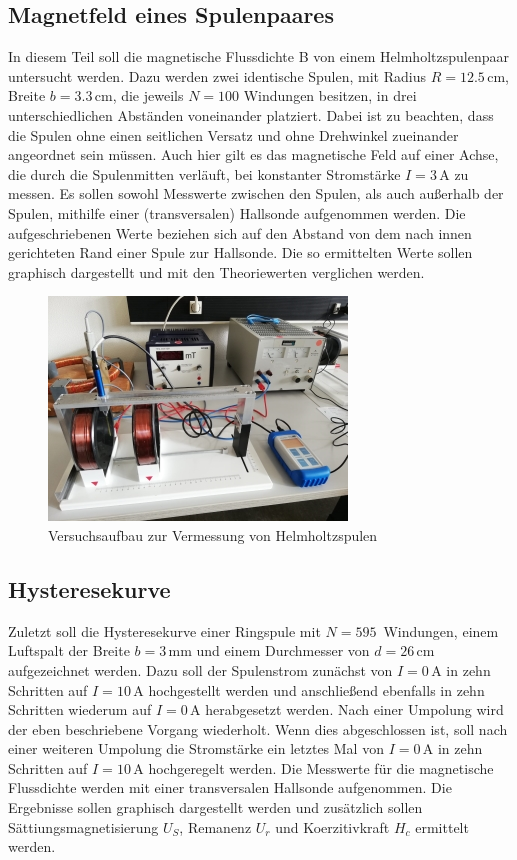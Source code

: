 \subsection{Magnetfeld eines Spulenpaares}

In diesem Teil soll die magnetische Flussdichte B von einem Helmholtzspulenpaar untersucht werden.
Dazu werden zwei identische Spulen, mit Radius $R = 12.5\, \si{\cm}$, Breite $b = 3.3\, \si{\centi\meter}$, die
jeweils $N = 100$ Windungen besitzen, in drei unterschiedlichen Abständen voneinander platziert. Dabei ist zu beachten,
dass die Spulen ohne einen seitlichen Versatz und ohne Drehwinkel zueinander angeordnet sein müssen. 
Auch hier gilt es das magnetische Feld auf einer Achse, die durch die Spulenmitten verläuft, bei konstanter
Stromstärke $I = 3\, \si{\ampere}$ zu messen. Es sollen sowohl Messwerte zwischen den Spulen, als auch 
außerhalb der Spulen, mithilfe einer (transversalen) Hallsonde aufgenommen werden. Die aufgeschriebenen 
Werte beziehen sich auf den Abstand von dem nach innen gerichteten Rand einer Spule zur Hallsonde.
Die so ermittelten Werte sollen graphisch dargestellt und mit den Theoriewerten verglichen werden.

\begin{figure}[H]
    \centering
    \includegraphics{content/Helmholtzspule.jpg}
    \caption{Versuchsaufbau zur Vermessung von Helmholtzspulen}
    \label{Helmholtzspulen}
\end{figure}

\subsection{Hysteresekurve}

Zuletzt soll die Hysteresekurve einer Ringspule mit $N = 595\,$ Windungen, einem Luftspalt der 
Breite $b = 3\, \si{\milli\meter}$ und einem Durchmesser von $d = 26\, \si{\centi\meter}$ aufgezeichnet werden. Dazu
soll der Spulenstrom zunächst von $I = 0\, \si{\ampere}$ in zehn Schritten auf $I = 10\, \si{\ampere}$ hochgestellt werden 
und anschließend ebenfalls in zehn Schritten wiederum auf $I = 0\, \si{\ampere}$ herabgesetzt werden. Nach einer Umpolung 
wird der eben beschriebene Vorgang wiederholt. Wenn dies abgeschlossen ist, soll nach einer weiteren Umpolung die Stromstärke
ein letztes Mal von $I = 0\, \si{\ampere}$ in zehn Schritten auf $I = 10\, \si{\ampere}$ hochgeregelt werden. Die 
Messwerte für die magnetische Flussdichte werden mit einer transversalen Hallsonde aufgenommen. Die Ergebnisse sollen 
graphisch dargestellt werden und zusätzlich sollen Sättiungsmagnetisierung $U_S$, Remanenz $U_r$ und 
Koerzitivkraft $H_c$ ermittelt werden.

